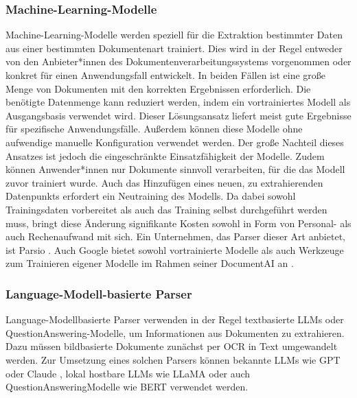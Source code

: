 \subsubsection{Machine-Learning-Modelle}
\label{subsubsec:vortrainierte-Modelle}

Machine-Learning-Modelle werden speziell für die Extraktion bestimmter Daten aus einer bestimmten Dokumentenart trainiert. Dies wird in der Regel entweder von den Anbieter*innen des Dokumentenverarbeitungssystems vorgenommen oder konkret für einen Anwendungsfall entwickelt. In beiden Fällen ist eine große Menge von Dokumenten mit den korrekten Ergebnissen erforderlich. Die benötigte Datenmenge kann reduziert werden, indem ein vortrainiertes Modell als Ausgangsbasis verwendet wird. Dieser Lösungsansatz liefert meist gute Ergebnisse für spezifische Anwendungsfälle. Außerdem können diese Modelle ohne aufwendige manuelle Konfiguration verwendet werden. Der große Nachteil dieses Ansatzes ist jedoch die eingeschränkte Einsatzfähigkeit der Modelle. Zudem können Anwender*innen nur Dokumente sinnvoll verarbeiten, für die das Modell zuvor trainiert wurde. Auch das Hinzufügen eines neuen, zu extrahierenden Datenpunkts erfordert ein Neutraining des Modells. Da dabei sowohl Trainingsdaten vorbereitet als auch das Training selbst durchgeführt werden muss, bringt diese Änderung signifikante Kosten sowohl in Form von Personal- als auch Rechenaufwand mit sich. Ein Unternehmen, das Parser dieser Art anbietet, ist Parsio \cite{parsio_pdf_extraction}. Auch Google bietet sowohl vortrainierte Modelle als auch Werkzeuge zum Trainieren eigener Modelle im Rahmen seiner DocumentAI an \cite{google_documentAI}.

\subsubsection{Language-Modell-basierte Parser}
\label{subsubsec:llm-basierte-modelle}

Language-Modell\-basierte Parser verwenden in der Regel textbasierte \glspl{LLM} oder Question\-Answering-Modelle, um Informationen aus Dokumenten zu extrahieren. Dazu müssen bildbasierte Dokumente zunächst per \gls{OCR} in Text umgewandelt werden. Zur Umsetzung eines solchen Parsers können bekannte \glspl{LLM} wie GPT \cite{BrownTomB2020LMaF, openai_chatgpt} oder Claude \cite{anthropic_claude}, lokal hostbare \glspl{LLM} wie LLaMA \cite{TouvronHugo2023LOaE} oder auch Question\-Answering\-Modelle wie BERT \cite{DevlinJacob2019BPoD} verwendet werden.

